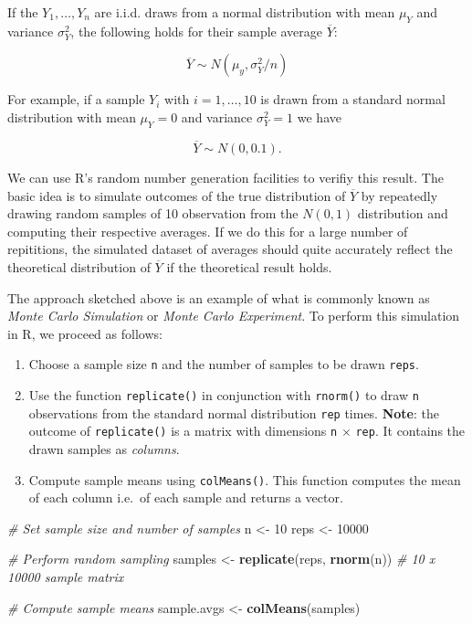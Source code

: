 \documentclass[]{book}
\newenvironment{Shaded}{\begin{snugshade}}{\end{snugshade}}
\newcommand{\KeywordTok}[1]{\textcolor[rgb]{0.13,0.29,0.53}{\textbf{#1}}}
\newcommand{\DecValTok}[1]{\textcolor[rgb]{0.00,0.00,0.81}{#1}}
\newcommand{\StringTok}[1]{\textcolor[rgb]{0.31,0.60,0.02}{#1}}
\newcommand{\CommentTok}[1]{\textcolor[rgb]{0.56,0.35,0.01}{\textit{#1}}}
\newcommand{\NormalTok}[1]{#1}
\providecommand{\tightlist}{%
  \setlength{\itemsep}{0pt}\setlength{\parskip}{0pt}}
\theoremstyle{definition}
\theoremstyle{definition}
\theoremstyle{definition}
\theoremstyle{remark}
\begin{document}
If the \(Y_1,\dots,Y_n\) are i.i.d. draws from a normal distribution
with mean \(\mu_Y\) and variance \(\sigma_Y^2\), the following holds for
their sample average \(\overline{Y}\):

\[ \overline{Y} \sim N(\mu_y, \sigma_Y^2/n) \tag{2.4} \]

For example, if a sample \(Y_i\) with \(i=1,\dots,10\) is drawn from a
standard normal distribution with mean \(\mu_Y = 0\) and variance
\(\sigma_Y^2=1\) we have

\[ \overline{Y} \sim N(0,0.1).\]

We can use R's random number generation facilities to verifiy this
result. The basic idea is to simulate outcomes of the true distribution
of \(\overline{Y}\) by repeatedly drawing random samples of 10
observation from the \(N(0,1)\) distribution and computing their
respective averages. If we do this for a large number of repititions,
the simulated dataset of averages should quite accurately reflect the
theoretical distribution of \(\overline{Y}\) if the theoretical result
holds.

The approach sketched above is an example of what is commonly known as
\emph{Monte Carlo Simulation} or \emph{Monte Carlo Experiment}. To
perform this simulation in R, we proceed as follows:

\begin{enumerate}
\def\labelenumi{\arabic{enumi}.}
\tightlist
\item
  Choose a sample size \texttt{n} and the number of samples to be drawn
  \texttt{reps}.
\item
  Use the function \texttt{replicate()} in conjunction with
  \texttt{rnorm()} to draw \texttt{n} observations from the standard
  normal distribution \texttt{rep} times. \textbf{Note}: the outcome of
  \texttt{replicate()} is a matrix with dimensions \texttt{n} \(\times\)
  \texttt{rep}. It contains the drawn samples as \emph{columns}.
\item
  Compute sample means using \texttt{colMeans()}. This function computes
  the mean of each column i.e.~of each sample and returns a vector.
\end{enumerate}

\begin{Shaded}
\begin{Highlighting}[]
\CommentTok{# Set sample size and number of samples}
\NormalTok{n <-}\StringTok{ }\DecValTok{10}
\NormalTok{reps <-}\StringTok{ }\DecValTok{10000}

\CommentTok{# Perform random sampling}
\NormalTok{samples <-}\StringTok{ }\KeywordTok{replicate}\NormalTok{(reps, }\KeywordTok{rnorm}\NormalTok{(n)) }\CommentTok{# 10 x 10000 sample matrix}

\CommentTok{# Compute sample means}
\NormalTok{sample.avgs <-}\StringTok{ }\KeywordTok{colMeans}\NormalTok{(samples)}
\end{Highlighting}
\end{Shaded}
\end{document}
